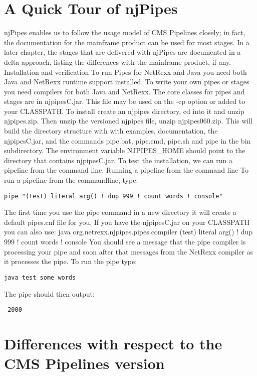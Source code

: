 \chapter{A Quick Tour of njPipes}
njPipes enables us to follow the usage model of CMS Pipelines closely; in fact, the documentation for the mainframe product can be used for most stages. In a later chapter, the stages that are delivered with njPipes are documented in a delta-approach, listing the differences with the mainframe product, if any.
Installation and verification
To run Pipes for NetRexx and Java you need both Java and NetRexx runtime support installed.  To write your own pipes or stages you need compilers for both Java and NetRexx. 
The core classes for pipes and stages are in njpipesC.jar.  This file may be used on the -cp option or added to your CLASSPATH.
To install create an njpipes directory, cd into it and unzip njpipes.zip. Then unzip the versioned njpipes file, unzip njpipes060.zip.  This will build the directory structure with with examples, documentation, the njpipesC.jar, and the commands pipe.bat, pipe.cmd, pipe.sh and pipe in the bin subdirectory. The environment variable NJPIPES\_HOME should point to the directory that contains njpipesC.jar.
To test the installation, we can run a pipeline from the command line.
Running a pipeline from the command line
 To run a pipeline from the commandline, type:
\begin{verbatim}
pipe "(test) literal arg() ! dup 999 ! count words ! console"
\end{verbatim}
The first time you use the pipe command in a new directory it will create a default pipes.cnf file for you. If you have the njpipesC.jar on your CLASSPATH you can also use:
java org.netrexx.njpipes.pipes.compiler (test) literal arg() ! dup 999 ! count words ! console
You should see a message that the pipe compiler is processing your pipe and soon after that messages from the NetRexx compiler as it processes the pipe.
To run the pipe type:
\begin{verbatim}
java test some words
\end{verbatim}
The pipe should then output:
\begin{verbatim}
 2000
\end{verbatim}
\chapter{Differences with respect to the CMS Pipelines version}

